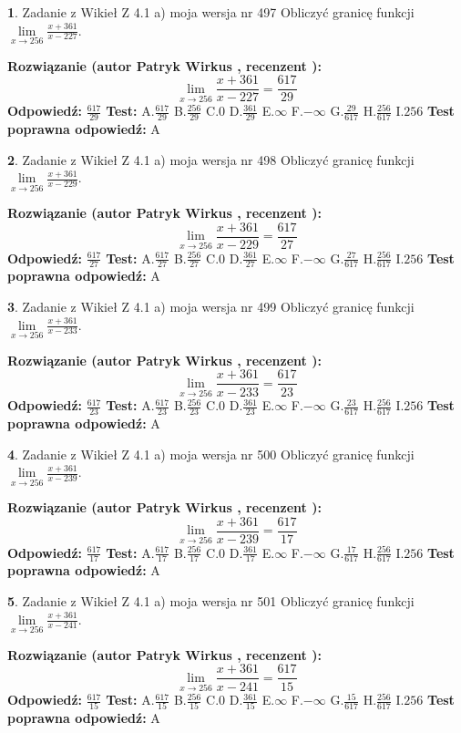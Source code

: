 \documentclass[12pt, a4paper]{article}
\theoremstyle{definition} %
\newtheorem{zad}{}
\newcommand{\zadStart}[1]{\begin{zad}#1\newline}
\newcommand{\zadStop}{\end{zad}}
\newcommand{\rozwStart}[2]{\noindent \textbf{Rozwiązanie (autor #1 , recenzent #2): }\newline}
\newcommand{\rozwStop}{\newline}
\newcommand{\odpStart}{\noindent \textbf{Odpowiedź:}\newline}
\newcommand{\odpStop}{\newline}
\newcommand{\testStart}{\noindent \textbf{Test:}\newline}
\newcommand{\testStop}{\newline}
\newcommand{\kluczStart}{\noindent \textbf{Test poprawna odpowiedź:}\newline}
\newcommand{\kluczStop}{\newline}
\begin{document}
\zadStart{Zadanie z Wikieł Z 4.1 a) moja wersja nr 497}
Obliczyć granicę funkcji $\lim\limits_{x\to256}\frac{x+361}{x-227}$.
\zadStop
\rozwStart{Patryk Wirkus}{}
$$\lim\limits_{x\to256}\frac{x+361}{x-227} = \frac{617}{29}$$
\rozwStop
\odpStart
$\frac{617}{29}$
\odpStop
\testStart
A.$\frac{617}{29}$
B.$\frac{256}{29}$
C.$0$
D.$\frac{361}{29}$
E.$\infty$
F.$-\infty$
G.$\frac{29}{617}$
H.$\frac{256}{617}$
I.$256$
\testStop
\kluczStart
A
\kluczStop



\zadStart{Zadanie z Wikieł Z 4.1 a) moja wersja nr 498}
Obliczyć granicę funkcji $\lim\limits_{x\to256}\frac{x+361}{x-229}$.
\zadStop
\rozwStart{Patryk Wirkus}{}
$$\lim\limits_{x\to256}\frac{x+361}{x-229} = \frac{617}{27}$$
\rozwStop
\odpStart
$\frac{617}{27}$
\odpStop
\testStart
A.$\frac{617}{27}$
B.$\frac{256}{27}$
C.$0$
D.$\frac{361}{27}$
E.$\infty$
F.$-\infty$
G.$\frac{27}{617}$
H.$\frac{256}{617}$
I.$256$
\testStop
\kluczStart
A
\kluczStop



\zadStart{Zadanie z Wikieł Z 4.1 a) moja wersja nr 499}
Obliczyć granicę funkcji $\lim\limits_{x\to256}\frac{x+361}{x-233}$.
\zadStop
\rozwStart{Patryk Wirkus}{}
$$\lim\limits_{x\to256}\frac{x+361}{x-233} = \frac{617}{23}$$
\rozwStop
\odpStart
$\frac{617}{23}$
\odpStop
\testStart
A.$\frac{617}{23}$
B.$\frac{256}{23}$
C.$0$
D.$\frac{361}{23}$
E.$\infty$
F.$-\infty$
G.$\frac{23}{617}$
H.$\frac{256}{617}$
I.$256$
\testStop
\kluczStart
A
\kluczStop



\zadStart{Zadanie z Wikieł Z 4.1 a) moja wersja nr 500}
Obliczyć granicę funkcji $\lim\limits_{x\to256}\frac{x+361}{x-239}$.
\zadStop
\rozwStart{Patryk Wirkus}{}
$$\lim\limits_{x\to256}\frac{x+361}{x-239} = \frac{617}{17}$$
\rozwStop
\odpStart
$\frac{617}{17}$
\odpStop
\testStart
A.$\frac{617}{17}$
B.$\frac{256}{17}$
C.$0$
D.$\frac{361}{17}$
E.$\infty$
F.$-\infty$
G.$\frac{17}{617}$
H.$\frac{256}{617}$
I.$256$
\testStop
\kluczStart
A
\kluczStop



\zadStart{Zadanie z Wikieł Z 4.1 a) moja wersja nr 501}
Obliczyć granicę funkcji $\lim\limits_{x\to256}\frac{x+361}{x-241}$.
\zadStop
\rozwStart{Patryk Wirkus}{}
$$\lim\limits_{x\to256}\frac{x+361}{x-241} = \frac{617}{15}$$
\rozwStop
\odpStart
$\frac{617}{15}$
\odpStop
\testStart
A.$\frac{617}{15}$
B.$\frac{256}{15}$
C.$0$
D.$\frac{361}{15}$
E.$\infty$
F.$-\infty$
G.$\frac{15}{617}$
H.$\frac{256}{617}$
I.$256$
\testStop
\kluczStart
A
\kluczStop
\end{document}
